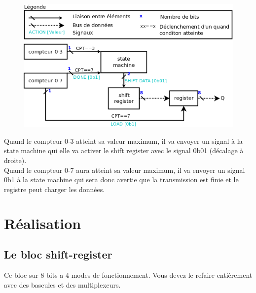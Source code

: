 \documentclass[a4paper]{article} %
\begin{document}
\begin{tcolorbox}[colframe=Monokaimagenta,colback=white]
\begin{figure}[H]
    \centering
    \includegraphics[width=.8\textwidth]{src/schema_bloc.png}
    \label{fig:schem_bloc}
\end{figure}

Quand le compteur 0-3 atteint sa valeur maximum, il va envoyer un signal à la state machine qui elle va activer le shift register avec le signal 0b01 (décalage à droite).\\
Quand le compteur 0-7 aura atteint sa valeur maximum, il va envoyer un signal 0b1 à la state machine qui sera donc avertie que la transmission est finie et le registre peut charger les données.

\end{tcolorbox}

\pagebreak
\section {Réalisation}
\subsection{Le bloc shift-register}
Ce bloc sur 8 bits a 4 modes de fonctionnement. Vous devez le refaire entièrement avec des bascules et des multiplexeurs.
\end{document}
